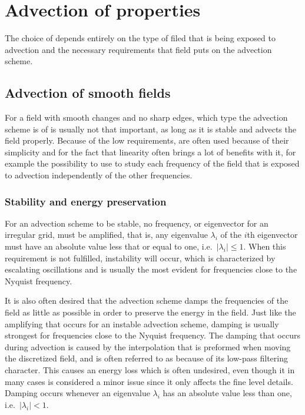 \chapter{Advection of properties}
\label{chap:advectionofproperties}

The choice of  depends entirely on the type of filed that is being exposed to advection and the necessary requirements that field puts on the advection scheme.

\section{Advection of smooth fields}

For a field with smooth changes and no sharp edges, which type the advection scheme is of is usually not that important, as long as it is stable and advects the field properly. Because of the low requirements,  are often used because of their simplicity and for the fact that linearity often brings a lot of benefits with it, for example the possibility to use  to study each frequency of the field that is exposed to advection independently of the other frequencies.

\subsection{Stability and energy preservation}

For an advection scheme to be stable, no frequency, or eigenvector for an irregular grid, must be amplified, that is, any eigenvalue $\lambda_i$ of the $i$th eigenvector must have an absolute value less that or equal to one, i.e.\ $|\lambda_i| \leq 1$. When this requirement is not fulfilled, instability will occur, which is characterized by escalating oscillations and is usually the most evident for frequencies close to the Nyquist frequency.


It is also often desired that the advection scheme damps the frequencies of the field as little as possible in order to preserve the energy in the field. Just like the amplifying that occurs for an instable advection scheme, damping is usually strongest for frequencies close to the Nyquist frequency. The damping that occurs during advection is caused by the interpolation that is preformed when moving the discretized field, and is often referred to as \smearing because of its low-pass filtering character. This causes an energy loss which is often undesired, even though it in many cases is considered a minor issue since it only affects the fine level details. Damping occurs whenever an eigenvalue $\lambda_i$ has an absolute value less than one, i.e.\ $|\lambda_i| < 1$.

